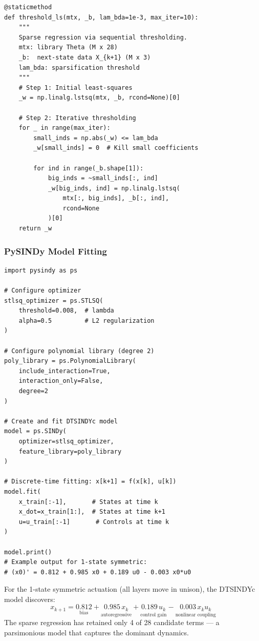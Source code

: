 \documentclass[11pt,a4paper]{article}
\begin{document}
\begin{codebox}
\begin{lstlisting}
@staticmethod
def threshold_ls(mtx, _b, lam_bda=1e-3, max_iter=10):
    """
    Sparse regression via sequential thresholding.
    mtx: library Theta (M x 28)
    _b:  next-state data X_{k+1} (M x 3)
    lam_bda: sparsification threshold
    """
    # Step 1: Initial least-squares
    _w = np.linalg.lstsq(mtx, _b, rcond=None)[0]

    # Step 2: Iterative thresholding
    for _ in range(max_iter):
        small_inds = np.abs(_w) <= lam_bda
        _w[small_inds] = 0  # Kill small coefficients

        for ind in range(_b.shape[1]):
            big_inds = ~small_inds[:, ind]
            _w[big_inds, ind] = np.linalg.lstsq(
                mtx[:, big_inds], _b[:, ind],
                rcond=None
            )[0]
    return _w
\end{lstlisting}
\end{codebox}

\subsubsection{PySINDy Model Fitting}

\begin{codebox}
\begin{lstlisting}
import pysindy as ps

# Configure optimizer
stlsq_optimizer = ps.STLSQ(
    threshold=0.008,  # lambda
    alpha=0.5         # L2 regularization
)

# Configure polynomial library (degree 2)
poly_library = ps.PolynomialLibrary(
    include_interaction=True,
    interaction_only=False,
    degree=2
)

# Create and fit DTSINDYc model
model = ps.SINDy(
    optimizer=stlsq_optimizer,
    feature_library=poly_library
)

# Discrete-time fitting: x[k+1] = f(x[k], u[k])
model.fit(
    x_train[:-1],       # States at time k
    x_dot=x_train[1:],  # States at time k+1
    u=u_train[:-1]       # Controls at time k
)

model.print()
# Example output for 1-state symmetric:
# (x0)' = 0.812 + 0.985 x0 + 0.189 u0 - 0.003 x0*u0
\end{lstlisting}
\end{codebox}

\begin{warningbox}
For the 1-state symmetric actuation (all layers move in unison), the DTSINDYc
model discovers:
\begin{equation}
    x_{k+1} = \underset{\text{bias}}{0.812} + \underset{\text{autoregressive}}{0.985\, x_k}
    + \underset{\text{control gain}}{0.189\, u_k}
    - \underset{\text{nonlinear coupling}}{0.003\, x_k u_k}
    \label{eq:discovered_model}
\end{equation}
The sparse regression has retained only 4 of 28 candidate terms --- a parsimonious
model that captures the dominant dynamics.
\end{warningbox}
\end{document}
